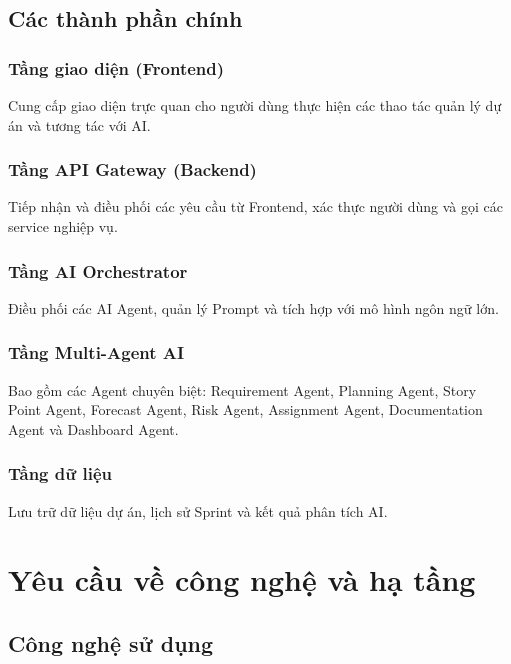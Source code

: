 \documentclass[12pt,a4paper]{report}
\begin{document}
\subsection{Các thành phần chính}

\subsubsection{Tầng giao diện (Frontend)}

Cung cấp giao diện trực quan cho người dùng thực hiện các thao tác quản lý dự án và tương tác với AI.

\subsubsection{Tầng API Gateway (Backend)}

Tiếp nhận và điều phối các yêu cầu từ Frontend, xác thực người dùng và gọi các service nghiệp vụ.

\subsubsection{Tầng AI Orchestrator}

Điều phối các AI Agent, quản lý Prompt và tích hợp với mô hình ngôn ngữ lớn.

\subsubsection{Tầng Multi-Agent AI}

Bao gồm các Agent chuyên biệt: Requirement Agent, Planning Agent, Story Point Agent, Forecast Agent, Risk Agent, Assignment Agent, Documentation Agent và Dashboard Agent.

\subsubsection{Tầng dữ liệu}

Lưu trữ dữ liệu dự án, lịch sử Sprint và kết quả phân tích AI.

\section{Yêu cầu về công nghệ và hạ tầng}

\subsection{Công nghệ sử dụng}
\end{document}
